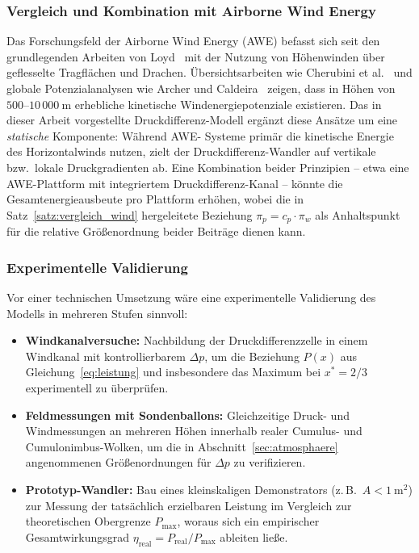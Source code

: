 ﻿\documentclass[a4paper,12pt]{article}
\theoremstyle{definition}
\begin{document}
\subsubsection{Vergleich und Kombination mit Airborne Wind Energy}

Das Forschungsfeld der Airborne Wind Energy (AWE) befasst sich seit den
grundlegenden Arbeiten von Loyd~\cite{loyd1980} mit der Nutzung von
Höhenwinden über geflesselte Tragflächen und Drachen. Übersichtsarbeiten
wie Cherubini et al.~\cite{cherubini2015} und globale Potenzialanalysen
wie Archer und Caldeira~\cite{archer2009} zeigen, dass in Höhen von
$500$--$10\,000\ \mathrm{m}$ erhebliche kinetische Windenergiepotenziale
existieren. Das in dieser Arbeit vorgestellte Druckdifferenz-Modell
ergänzt diese Ansätze um eine \emph{statische} Komponente: Während AWE-
Systeme primär die kinetische Energie des Horizontalwinds nutzen, zielt
der Druckdifferenz-Wandler auf vertikale bzw.\ lokale Druckgradienten ab.
Eine Kombination beider Prinzipien -- etwa eine AWE-Plattform mit
integriertem Druckdifferenz-Kanal -- könnte die Gesamtenergieausbeute pro
Plattform erhöhen, wobei die in Satz~\ref{satz:vergleich_wind}
hergeleitete Beziehung $\pi_p = c_p \cdot \pi_w$ als Anhaltspunkt für die
relative Größenordnung beider Beiträge dienen kann.

\subsubsection{Experimentelle Validierung}

Vor einer technischen Umsetzung wäre eine experimentelle Validierung des
Modells in mehreren Stufen sinnvoll:
\begin{itemize}
	\item \textbf{Windkanalversuche:} Nachbildung der
	Druckdifferenzzelle in einem Windkanal mit kontrollierbarem
	$\Delta p$, um die Beziehung $P(x)$ aus Gleichung~\eqref{eq:leistung}
	und insbesondere das Maximum bei $x^\ast = 2/3$ experimentell zu
	überprüfen.
	\item \textbf{Feldmessungen mit Sondenballons:} Gleichzeitige Druck-
	und Windmessungen an mehreren Höhen innerhalb realer Cumulus- und
	Cumulonimbus-Wolken, um die in Abschnitt~\ref{sec:atmosphaere}
	angenommenen Größenordnungen für $\Delta p$ zu verifizieren.
	\item \textbf{Prototyp-Wandler:} Bau eines kleinskaligen
	Demonstrators (z.\,B.\ $A < 1\ \mathrm{m^2}$) zur Messung der
	tatsächlich erzielbaren Leistung im Vergleich zur theoretischen
	Obergrenze $P_{\max}$, woraus sich ein empirischer
	Gesamtwirkungsgrad $\eta_{\mathrm{real}} = P_{\mathrm{real}} /
	P_{\max}$ ableiten ließe.
\end{itemize}
\end{document}
